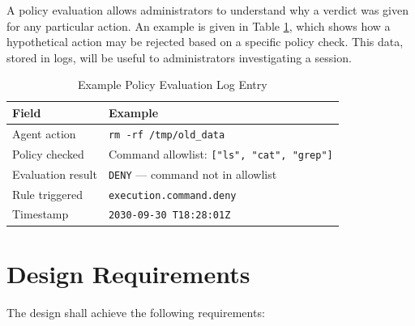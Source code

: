 \documentclass[a4paper]{report}
\begin{document}
A policy evaluation allows administrators to understand why a verdict was given for any particular action.
An example is given in Table \ref{tab:policy-eval}, which shows how a hypothetical action may be rejected based on a specific policy check. This data, stored in logs, will be useful to administrators investigating a session.
\begin{table}[h]
\centering
\renewcommand{\arraystretch}{1.2}  %
\caption{Example Policy Evaluation Log Entry}
\label{tab:policy-eval}
\begin{tabular}{@{}ll@{}}
\toprule
\textbf{Field} & \textbf{Example} \\
\midrule
Agent action & \texttt{rm -rf /tmp/old\_data} \\
Policy checked & Command allowlist: \texttt{["ls", "cat", "grep"]} \\
Evaluation result & \texttt{DENY} — command not in allowlist \\
Rule triggered & \texttt{execution.command.deny} \\
Timestamp & \texttt{2030-09-30 T18:28:01Z} \\
\bottomrule
\end{tabular}
\end{table}


\section{Design Requirements}
The design shall achieve the following requirements:
\end{document}
